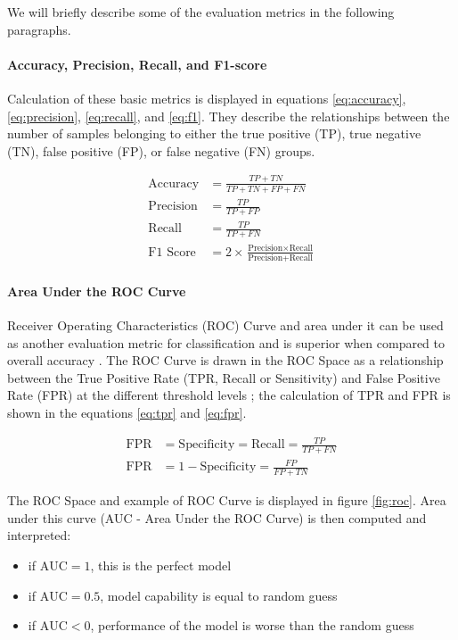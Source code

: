 We will briefly describe some of the evaluation metrics in the following paragraphs. 

\paragraph{Accuracy, Precision, Recall, and F1-score} Calculation of these basic metrics is displayed in equations \ref{eq:accuracy}, \ref{eq:precision}, \ref{eq:recall}, and \ref{eq:f1}. They describe the relationships between the number of samples belonging to either the true positive (TP), true negative (TN), false positive (FP), or false negative (FN) groups.

\begin{align}
\label{eq:accuracy}
\text{Accuracy} &= \frac{TP + TN}{TP + TN + FP + FN} \\
\label{eq:precision}
\text{Precision} &= \frac{TP}{TP + FP} \\
\label{eq:recall}
\text{Recall} &= \frac{TP}{TP + FN} \\
\label{eq:f1}
\text{F1\ Score} &= 2 \!\times\! \frac{\text{Precision} \!\times\! \text{Recall}}{\text{Precision} + \text{Recall}}
\end{align}

\paragraph{Area Under the ROC Curve}
Receiver Operating Characteristics (ROC) Curve and area under it can be used as another evaluation metric for classification and is superior when compared to overall accuracy \cite{Bradley1997}. The ROC Curve is drawn in the ROC Space as a relationship between the True Positive Rate (TPR, Recall or Sensitivity) and False Positive Rate (FPR) at the different threshold levels \cite{Bradley1997, Nahm2022, Fawcett2006}; the calculation of TPR and FPR is shown in the equations \ref{eq:tpr} and \ref{eq:fpr}.

\begin{align}
\label{eq:tpr}
\text{FPR} &=\text{Specificity} = \text{Recall} = \frac{TP}{TP + FN} \\
\label{eq:fpr}
\text{FPR} &= 1-\text{Specificity} = \frac{FP}{FP + TN}
\end{align}

The ROC Space and example of ROC Curve is displayed in figure \ref{fig:roc}. Area under this curve (AUC - Area Under the ROC Curve) is then computed and interpreted:

\begin{itemize}
    \item if $\text{AUC} = 1$, this is the perfect model
    \item if $\text{AUC} = 0.5$, model capability is equal to random guess
    \item if $\text{AUC} < 0$, performance of the model is worse than the random guess
\end{itemize}


